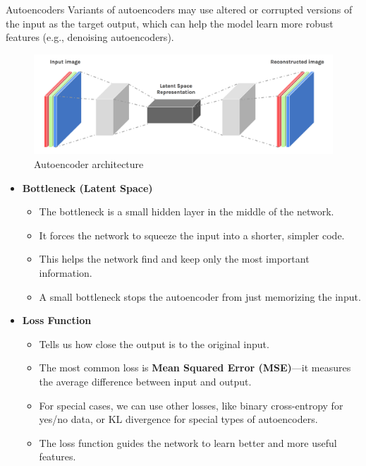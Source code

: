 \begin{frame}[allowframebreaks]{Autoencoders}
Variants of autoencoders may use altered or corrupted versions of the input as the target output, which can help the model learn more robust features (e.g., denoising autoencoders).

\framebreak

\begin{figure}
    \centering
    \includegraphics[height=\textheight, width=1.05\textwidth, keepaspectratio]{images/autoencoders/architecture.png}
    \caption*{Autoencoder architecture}
    \end{figure}

\framebreak

\begin{itemize}
    \setlength{\itemsep}{-0.2em}
        \item \textbf{Bottleneck (Latent Space)}
        \begin{itemize}
            \item The bottleneck is a small hidden layer in the middle of the network.
            \item It forces the network to squeeze the input into a shorter, simpler code.
            \item This helps the network find and keep only the most important information.
            \item A small bottleneck stops the autoencoder from just memorizing the input.
        \end{itemize}
        \item \textbf{Loss Function}
        \begin{itemize}
            \item Tells us how close the output is to the original input.
            \item The most common loss is \textbf{Mean Squared Error (MSE)}—it measures the average difference between input and output.
            \item For special cases, we can use other losses, like binary cross-entropy for yes/no data, or KL divergence for special types of autoencoders.
            \item The loss function guides the network to learn better and more useful features.
        \end{itemize}
\end{itemize}
\end{frame}